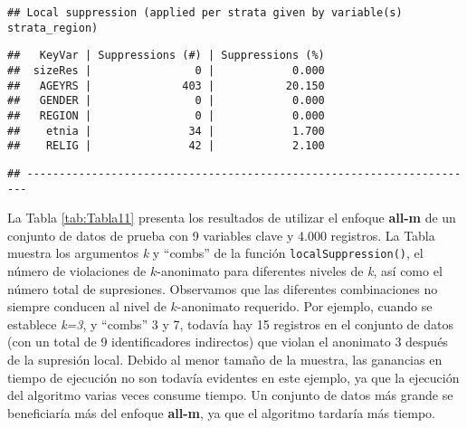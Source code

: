 \documentclass[
]{book}
\theoremstyle{definition}
\theoremstyle{definition}
\theoremstyle{definition}
\theoremstyle{definition}
\theoremstyle{remark}
\begin{document}
\begin{verbatim}
## Local suppression (applied per strata given by variable(s) strata_region)
\end{verbatim}

\begin{verbatim}
##   KeyVar | Suppressions (#) | Suppressions (%)
##  sizeRes |                0 |            0.000
##   AGEYRS |              403 |           20.150
##   GENDER |                0 |            0.000
##   REGION |                0 |            0.000
##    etnia |               34 |            1.700
##    RELIG |               42 |            2.100
\end{verbatim}

\begin{verbatim}
## ----------------------------------------------------------------------
\end{verbatim}

La Tabla \ref{tab:Tabla11} presenta los resultados de utilizar el enfoque \textbf{all-m} de un conjunto de datos de prueba con 9 variables clave y 4.000 registros. La Tabla muestra los argumentos \emph{k} y ``combs'' de la función \texttt{localSuppression()}, el número de violaciones de \(k\)-anonimato para diferentes niveles de \emph{k}, así como el número total de supresiones. Observamos que las diferentes combinaciones no siempre conducen al nivel de \(k\)-anonimato requerido. Por ejemplo, cuando se establece \emph{k=3}, y ``combs'' 3 y 7, todavía hay 15 registros en el conjunto de datos (con un total de 9 identificadores indirectos) que violan el anonimato 3 después de la supresión local. Debido al menor tamaño de la muestra, las ganancias en tiempo de ejecución no son todavía evidentes en este ejemplo, ya que la ejecución del algoritmo varias veces consume tiempo. Un conjunto de datos más grande se beneficiaría más del enfoque \textbf{all-m}, ya que el algoritmo tardaría más tiempo.
\end{document}
